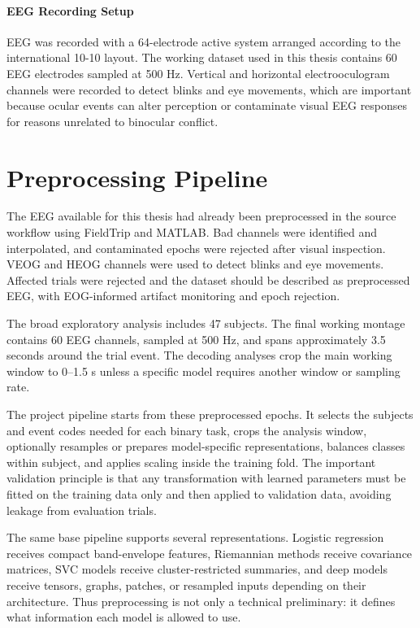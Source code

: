 \documentclass[11pt,a4paper,chapterprefix=false,parskip=false]{scrreprt}
\begin{document}
\paragraph{EEG Recording Setup}
EEG was recorded with a 64-electrode active system arranged according to the international 10-10 layout. The working dataset used in this thesis contains 60 EEG electrodes sampled at 500 Hz. Vertical and horizontal electrooculogram channels were recorded to detect blinks and eye movements, which are important because ocular events can alter perception or contaminate visual EEG responses for reasons unrelated to binocular conflict.


\section{Preprocessing Pipeline}
\label{sec:dataset-preprocessing}
The EEG available for this thesis had already been preprocessed in the source workflow using FieldTrip and MATLAB. Bad channels were identified and interpolated, and contaminated epochs were rejected after visual inspection. VEOG and HEOG channels were used to detect blinks and eye movements. Affected trials were rejected and the dataset should be described as preprocessed EEG, with EOG-informed artifact monitoring and epoch rejection.

The broad exploratory analysis includes 47 subjects. The final working montage contains 60 EEG channels, sampled at 500 Hz, and spans approximately 3.5 seconds around the trial event. The decoding analyses crop the main working window to 0--1.5 s unless a specific model requires another window or sampling rate.

The project pipeline starts from these preprocessed epochs. It selects the subjects and event codes needed for each binary task, crops the analysis window, optionally resamples or prepares model-specific representations, balances classes within subject, and applies scaling inside the training fold. The important validation principle is that any transformation with learned parameters must be fitted on the training data only and then applied to validation data, avoiding leakage from evaluation trials.

The same base pipeline supports several representations. Logistic regression receives compact band-envelope features, Riemannian methods receive covariance matrices, SVC models receive cluster-restricted summaries, and deep models receive tensors, graphs, patches, or resampled inputs depending on their architecture. Thus preprocessing is not only a technical preliminary: it defines what information each model is allowed to use.
\end{document}
